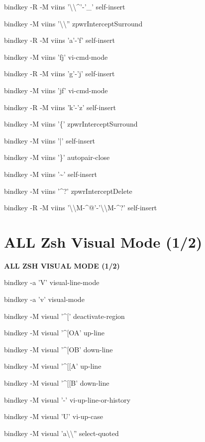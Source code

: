 \documentclass[11pt,a4paper,twoside]{book}
\begin{document}
bindkey -R -M viins '\textbackslash{}\textbackslash{}\textasciicircum{}'-'\_' self-insert

bindkey -M viins '\textbackslash{}\textbackslash{}'' zpwrInterceptSurround

bindkey -R -M viins 'a'-'f' self-insert

bindkey -M viins 'fj' vi-cmd-mode

bindkey -R -M viins 'g'-'j' self-insert

bindkey -M viins 'jf' vi-cmd-mode

bindkey -R -M viins 'k'-'z' self-insert

bindkey -M viins '\{' zpwrInterceptSurround

bindkey -M viins '|' self-insert

bindkey -M viins '\}' autopair-close

bindkey -M viins '\textasciitilde{}' self-insert

bindkey -M viins '\textasciicircum{}?' zpwrInterceptDelete

bindkey -R -M viins '\textbackslash{}\textbackslash{}M-\textasciicircum{}@'-'\textbackslash{}\textbackslash{}M-\textasciicircum{}?' self-insert


\vspace{16pt}

\section{ALL Zsh Visual Mode (1/2)}


\vspace{10pt}
{\large\bfseries\color{neoncyan} ALL ZSH VISUAL MODE (1/2)}\vspace{6pt}

bindkey -a 'V' visual-line-mode

bindkey -a 'v' visual-mode

bindkey -M visual '\textasciicircum{}[' deactivate-region

bindkey -M visual '\textasciicircum{}[OA' up-line

bindkey -M visual '\textasciicircum{}[OB' down-line

bindkey -M visual '\textasciicircum{}[[A' up-line

bindkey -M visual '\textasciicircum{}[[B' down-line

bindkey -M visual '-' vi-up-line-or-history

bindkey -M visual 'U' vi-up-case

bindkey -M visual 'a\textbackslash{}\textbackslash{}'' select-quoted
\end{document}
